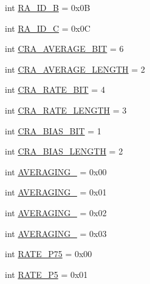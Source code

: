 \begin{DoxyCompactItemize}
\item 
int \hyperlink{classconcretesensor_1_1hmc5883l_1_1HMC5883L_a02c453eba1fc4653dcbbd54194a8e23f}{R\+A\+\_\+\+I\+D\+\_\+\+B} = 0x0\+B
\item 
int \hyperlink{classconcretesensor_1_1hmc5883l_1_1HMC5883L_a59190f34ce7d06a9301ba72b13eacd0a}{R\+A\+\_\+\+I\+D\+\_\+\+C} = 0x0\+C
\item 
int \hyperlink{classconcretesensor_1_1hmc5883l_1_1HMC5883L_a30adff5e07131365caa515a3a4f5f9c5}{C\+R\+A\+\_\+\+A\+V\+E\+R\+A\+G\+E\+\_\+\+B\+I\+T} = 6
\item 
int \hyperlink{classconcretesensor_1_1hmc5883l_1_1HMC5883L_a7ff6720b630ec649a66a1506546f81cd}{C\+R\+A\+\_\+\+A\+V\+E\+R\+A\+G\+E\+\_\+\+L\+E\+N\+G\+T\+H} = 2
\item 
int \hyperlink{classconcretesensor_1_1hmc5883l_1_1HMC5883L_a4a94022494159fc7df157d1a867ee0c4}{C\+R\+A\+\_\+\+R\+A\+T\+E\+\_\+\+B\+I\+T} = 4
\item 
int \hyperlink{classconcretesensor_1_1hmc5883l_1_1HMC5883L_a3f6eeef041166a1b5a9c1d75187bca15}{C\+R\+A\+\_\+\+R\+A\+T\+E\+\_\+\+L\+E\+N\+G\+T\+H} = 3
\item 
int \hyperlink{classconcretesensor_1_1hmc5883l_1_1HMC5883L_a191834b9309d34ceda3a688744564b1a}{C\+R\+A\+\_\+\+B\+I\+A\+S\+\_\+\+B\+I\+T} = 1
\item 
int \hyperlink{classconcretesensor_1_1hmc5883l_1_1HMC5883L_a1e530f772c0d6618c4d7770b9ce8e83b}{C\+R\+A\+\_\+\+B\+I\+A\+S\+\_\+\+L\+E\+N\+G\+T\+H} = 2
\item 
int \hyperlink{classconcretesensor_1_1hmc5883l_1_1HMC5883L_a2cfbfbf8c957a164be4153b22a7d90c4}{A\+V\+E\+R\+A\+G\+I\+N\+G\+\_} = 0x00
\item 
int \hyperlink{classconcretesensor_1_1hmc5883l_1_1HMC5883L_a01cdb6dc819f62fad6b985c4fc68475b}{A\+V\+E\+R\+A\+G\+I\+N\+G\+\_} = 0x01
\item 
int \hyperlink{classconcretesensor_1_1hmc5883l_1_1HMC5883L_acea4a1023bd5558337f29323d9050aa3}{A\+V\+E\+R\+A\+G\+I\+N\+G\+\_} = 0x02
\item 
int \hyperlink{classconcretesensor_1_1hmc5883l_1_1HMC5883L_ae63a71cb562d73f44f84bf9952bdb381}{A\+V\+E\+R\+A\+G\+I\+N\+G\+\_} = 0x03
\item 
int \hyperlink{classconcretesensor_1_1hmc5883l_1_1HMC5883L_a6a47527fa666a76bae1678aa67e23a3b}{R\+A\+T\+E\+\_\+P75} = 0x00
\item 
int \hyperlink{classconcretesensor_1_1hmc5883l_1_1HMC5883L_ad28ab056e6a7b12f3c04501ddf37430b}{R\+A\+T\+E\+\_\+P5} = 0x01
\item 

\end{DoxyCompactItemize}
